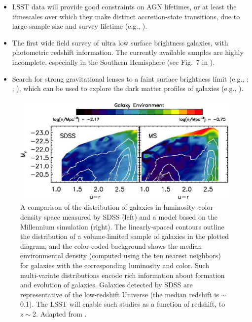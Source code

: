 \begin{itemize}
\item LSST data will provide good constraints on AGN lifetimes, or at least the timescales over which
         they make distinct accretion-state transitions, due to large sample
         size and survey lifetime (e.g., \cite{2003ApJ...597L.109M}).
\item The first wide field survey of ultra low surface brightness galaxies, with
      photometric redshift information. The currently available samples are highly
      incomplete, especially in the Southern Hemisphere (see Fig.~7 in \cite{2007ApJ...654..897B}).
\item Search for strong gravitational lenses to a faint surface
  brightness limit (e.g., \cite{1998A&A...330....1B}; \cite{1998ApJ...498L.107T};
  \cite{2007ApJ...671L...9B}), which can be used to
  explore the dark matter profiles of galaxies (e.g., \cite{2006ApJ...640..662T}).
\end{itemize}


\begin{figure}
\includegraphics[width=1.0\hsize,clip]{cowan.pdf}
\caption{A comparison of the distribution of galaxies in
luminosity--color--density space measured by SDSS (left) and a model based
on the Millennium simulation (right). The linearly-spaced contours outline
the distribution of a volume-limited sample of galaxies in the plotted diagram, and
the color-coded background shows the median environmental density (computed
using the ten nearest neighbors) for galaxies
with the corresponding luminosity and color. Such multi-variate distributions
encode rich information about formation and evolution of galaxies. Galaxies
detected by SDSS are representative of the low-redshift Universe (the median
redshift is $\sim$0.1). The LSST will enable such studies as a function of
redshift, to $z\sim$2. Adapted from \cite{2008ApJ...674L..13C}.}
\label{Fig:cowan}
\end{figure}


